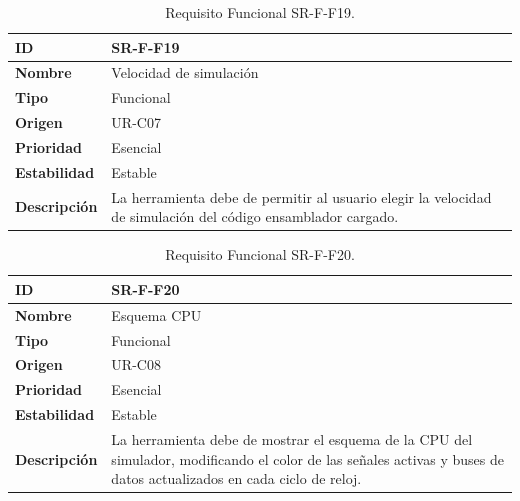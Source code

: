 \begin{center}
\begin{table}[htbp]
\centering
\begin{tabular}{@{}p{2.5cm} p{9cm}@{}} 
\toprule
\textbf{ID} 				& SR-F-F19 \\
\midrule
\textbf{Nombre} 			& Velocidad de simulación\\
\midrule
\textbf{Tipo} 			& Funcional \\
\midrule
\textbf{Origen} 			& UR-C07 \\
\midrule
\textbf{Prioridad}		& Esencial \\
\midrule
\textbf{Estabilidad} 		& Estable \\
\midrule
\textbf{Descripción} 	& La herramienta debe de permitir al usuario elegir la velocidad de simulación del código ensamblador cargado. \\
\bottomrule
\end{tabular}
\caption{Requisito Funcional SR-F-F19.}
\label{tab:srff19}
\end{table}
\end{center}

\begin{center}
\begin{table}[htbp]
\centering
\begin{tabular}{@{}p{2.5cm} p{9cm}@{}} 
\toprule
\textbf{ID} 				& SR-F-F20 \\
\midrule
\textbf{Nombre} 			& Esquema CPU\\
\midrule
\textbf{Tipo} 			& Funcional \\
\midrule
\textbf{Origen} 			& UR-C08 \\
\midrule
\textbf{Prioridad}		& Esencial \\
\midrule
\textbf{Estabilidad} 		& Estable \\
\midrule
\textbf{Descripción} 	& La herramienta debe de mostrar el esquema de la CPU del simulador, modificando el color de las señales activas y buses de datos actualizados en cada ciclo de reloj. \\
\bottomrule
\end{tabular}
\caption{Requisito Funcional SR-F-F20.}
\label{tab:srff20}
\end{table}
\end{center}

